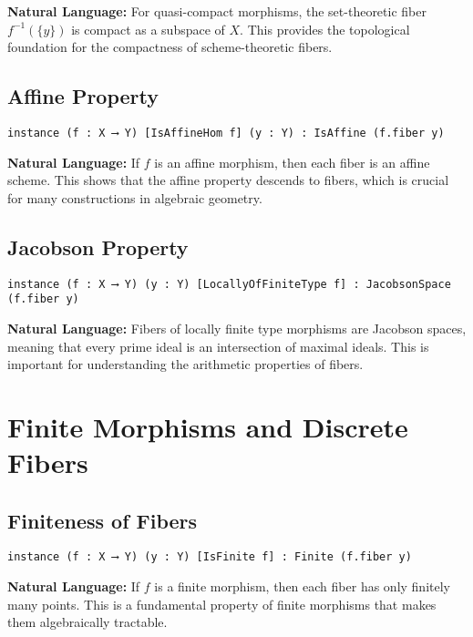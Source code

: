 \documentclass{article}
\theoremstyle{definition}
\begin{document}
\textbf{Natural Language:} For quasi-compact morphisms, the set-theoretic fiber $f^{-1}(\{y\})$ is compact as a subspace of $X$. This provides the topological foundation for the compactness of scheme-theoretic fibers.

\subsection{Affine Property}

\begin{lstlisting}
instance (f : X ⟶ Y) [IsAffineHom f] (y : Y) : IsAffine (f.fiber y)
\end{lstlisting}

\textbf{Natural Language:} If $f$ is an affine morphism, then each fiber is an affine scheme. This shows that the affine property descends to fibers, which is crucial for many constructions in algebraic geometry.

\subsection{Jacobson Property}

\begin{lstlisting}
instance (f : X ⟶ Y) (y : Y) [LocallyOfFiniteType f] : JacobsonSpace (f.fiber y)
\end{lstlisting}

\textbf{Natural Language:} Fibers of locally finite type morphisms are Jacobson spaces, meaning that every prime ideal is an intersection of maximal ideals. This is important for understanding the arithmetic properties of fibers.

\section{Finite Morphisms and Discrete Fibers}

\subsection{Finiteness of Fibers}

\begin{lstlisting}
instance (f : X ⟶ Y) (y : Y) [IsFinite f] : Finite (f.fiber y)
\end{lstlisting}

\textbf{Natural Language:} If $f$ is a finite morphism, then each fiber has only finitely many points. This is a fundamental property of finite morphisms that makes them algebraically tractable.
\end{document}
